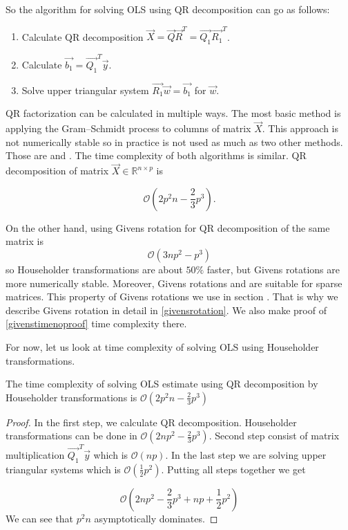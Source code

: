 So the algorithm for solving OLS using QR decomposition can go as follows:
\begin{enumerate}
  \item Calculate QR decomposition $\vec{X} = \vec{Q}\vec{R}^T = \vec{Q_1}\vec{R_1}^T$.
  \item Calculate $\vec{b_1} = \vec{Q_1}^T \vec{y}$.
  \item Solve upper triangular system $\vec{R_1}\vec{w} = \vec{b_1}$ for $\vec{w}$.
\end{enumerate}

QR factorization can be calculated in multiple ways. The most basic method is applying the Gram–Schmidt process
to columns of matrix $\vec{X}$. This approach is not numerically stable so in practice is not used as much as two other methods. Those are  and .
The time complexity of both algorithms is similar. QR decomposition of matrix $\vec{X} \in \mathbb{R}^{n \times p}$ is 

\begin{equation}
    \mathcal{O}(2p^2n - \frac{2}{3}p^3).
\end{equation}

On the other hand, using Givens rotation for QR decomposition of the same matrix is 
\begin{equation} \label{givenstimenoproof}
    \mathcal{O}(3np^2 - p^3)
\end{equation}
so Householder transformations are about $50\%$ faster, but Givens rotations are more numerically stable. 
Moreover, Givens rotations and are suitable for sparse matrices.  This property of Givens rotations we use in section .
That is why we describe Givens rotation in detail in \ref{givensrotation}. We also make proof of \eqref{givenstimenoproof} time complexity there.

For now, let us look at time complexity of solving OLS using Householder transformations. 
\begin{observation}
    The time complexity of solving OLS estimate using QR decomposition by Householder transformations is $\mathcal{O}(2p^2n - \frac{2}{3}p^3)$
\end{observation}

\begin{proof}
    In the first step, we calculate QR decomposition. Householder transformations can be done in $\mathcal{O}(2np^2 - \frac{2}{3}p^3)$.
    Second step consist of matrix multiplication $\vec{Q_1}^T \vec{y}$ which is $\mathcal{O}(np)$.  In the last step we are solving upper triangular systems which is $\mathcal{O}(\frac{1}{2}p^2)$.
    Putting all steps together we get  

    \begin{equation} \label{time:complexity:ols:qr:householder}
        \mathcal{O}(2np^2 - \frac{2}{3}p^3 + np + \frac{1}{2}p^2)
    \end{equation}
    We can see that $p^2n$ asymptotically dominates.
\end{proof}

